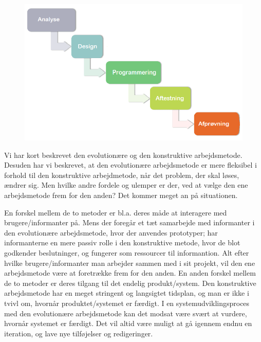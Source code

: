 \begin{figure}[ht]
	\centering
	\includegraphics[scale=0.5]{billeder/konstruktivemetode.png}
  	\label{fig:konstruktivemetode}
\end{figure}

Vi har kort beskrevet den evolutionære og den konstruktive arbejdsmetode. Desuden har vi beskrevet, at den evolutionære arbejdsmetode er mere fleksibel i forhold til den konstruktive arbejdmetode, når det problem, der skal løses, ændrer sig. Men hvilke andre fordele og ulemper er der, ved at vælge den ene arbejdsmetode frem for den anden? Det kommer meget an på situationen.

En forskel mellem de to metoder er bl.a. deres måde at interagere med brugere/informanter på. Mens der foregår et tæt samarbejde med informanter i den evolutionære arbejdsmetode, hvor der anvendes prototyper; har informanterne en mere passiv rolle i den konstruktive metode, hvor de blot godkender beslutninger, og fungerer som ressourcer til informantion. Alt efter hvilke brugere/informanter man arbejder sammen med i sit projekt, vil den ene arbejdsmetode være at foretrække frem for den anden. En anden forskel mellem de to metoder er deres tilgang til det endelig produkt/system. Den konstruktive arbejdsmetode har en meget stringent og langsigtet tidsplan, og man er ikke i tvivl om, hvornår produktet/systemet er færdigt. I en systemudviklingsproces med den evolutionære arbejdsmetode kan det modsat være svært at vurdere,  hvornår systemet er færdigt. Det vil altid være muligt at gå igennem endnu en iteration, og lave nye tilføjelser og redigeringer.


